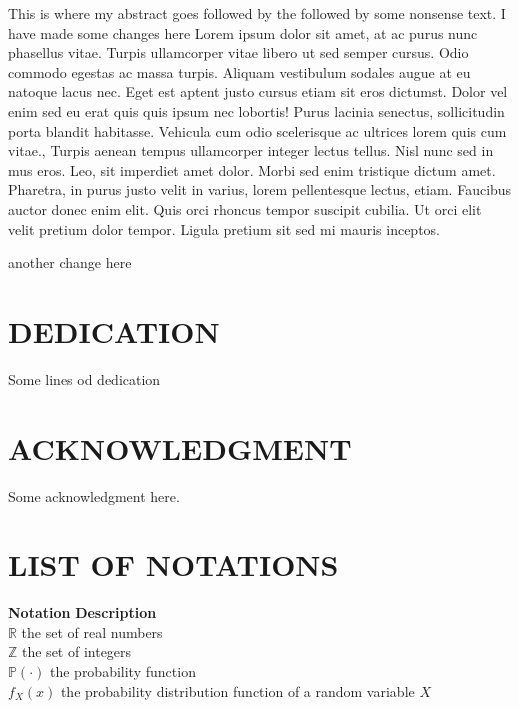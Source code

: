 \documentclass{source/tex/templates/maththesis}
\begin{document}
This is where my abstract goes followed by the followed by some nonsense text. I have made some changes here Lorem ipsum dolor sit amet, at ac purus nunc phasellus vitae. Turpis ullamcorper vitae libero ut sed semper cursus. Odio commodo egestas ac massa turpis. Aliquam vestibulum sodales augue at eu natoque lacus nec. Eget est aptent justo cursus etiam sit eros dictumst. Dolor vel enim sed eu erat quis quis ipsum nec lobortis! Purus lacinia senectus, sollicitudin porta blandit habitasse. Vehicula cum odio scelerisque ac ultrices lorem quis cum vitae., Turpis aenean tempus ullamcorper integer lectus tellus. Nisl nunc sed in mus eros. Leo, sit imperdiet amet dolor. Morbi sed enim tristique dictum amet. Pharetra, in purus justo velit in varius, lorem pellentesque lectus, etiam. Faucibus auctor donec enim elit. Quis orci rhoncus tempor suscipit cubilia. Ut orci elit velit pretium dolor tempor. Ligula pretium sit sed mi mauris inceptos.

another change here

\hypertarget{dedication}{%
\chapter*{DEDICATION}\label{dedication}}

Some lines od dedication

\hypertarget{acknowledgment}{%
\chapter*{ACKNOWLEDGMENT}\label{acknowledgment}}

Some acknowledgment here.

\tableofcontents
{}

\newpage
{}\setcounter{page}{1}

\hypertarget{list-of-notations}{%
\chapter*{LIST OF NOTATIONS}\label{list-of-notations}}

\begin{tabbing}

\hspace{0.25in} \={\bf Notation} \hspace{0.5in}\={\bf Description}\\ 
\>$\mathbb{R}$ \>the set of real numbers \\
\>$\mathbb{Z}$ \>the set of integers \\
\>$\mathbb{P}(\cdot)$ \>the probability function \\
\>$f_X(x)$ \>the probability distribution function of a random variable $X$ \\

\end{tabbing}
\end{document}

